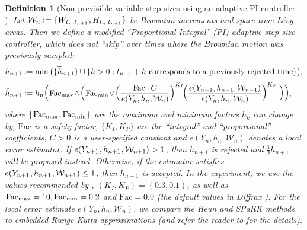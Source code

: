 \documentclass[sn-mathphys-num]{sn-jnl}%
\newtheorem{definition}{Definition}%
\newcommand{\m}{\hspace{0.25mm}}
\begin{document}
\begin{definition}[Non-previsible variable step sizes using an adaptive PI controller {\cite{ilie2015adaptive}}]
Let $\mathcal{W}_n := \{W_{t_n, t_{n+1}}\m, H_{t_n, t_{n+1}}\}$ be Brownian increments and space-time L\'{e}vy areas. Then we define a modified ``Proportional-Integral'' (PI) adaptive step size controller, which does not ``skip'' over times where the Brownian motion was previously sampled:\label{def:pi_controller}
\begin{align*}
h_{n+1} & := \min\big(\{\widetilde{h}_{n+1}\}\hspace{-0.125mm}\cup\hspace{-0.125mm}\{h > 0 : t_{n+1} + h\text{ corresponds to a previously rejected time}\}\big),\\[3pt]
\widetilde{h}_{n+1} & := h_n\bigg(\mathrm{Fac}_{\max}\hspace{-0.5mm}\wedge\hspace{-0.5mm}\bigg(\mathrm{Fac}_{\min}\hspace{-0.5mm}\vee\hspace{-0.5mm}\bigg(\frac{\mathrm{Fac}\cdot C}{e(Y_n, h_n, \mathcal{W}_n)}\bigg)^{K_I}\hspace{-0.5mm}\bigg(\frac{e(Y_{n-1}, h_{n-1}, \mathcal{W}_{n-1})}{e(Y_n, h_n, \mathcal{W}_n)}\bigg)^{K_P}\,\bigg)\bigg),
\end{align*}
where $\{\m\mathrm{Fac}_{\max}\m, \mathrm{Fac}_{\min}\}$ are the maximum and minimum factors $h_k$ can change by, $\mathrm{Fac}$ is a safety factor, $\{K_I, K_P\}$ are the ``integral'' and ``proportional'' coefficients, $C > 0$ is a  user-specified constant and $e(Y_n, h_n, \mathcal{W}_n)$ denotes a local error estimator. If $e(Y_{n+1}\m, h_{n+1}\m, \mathcal{W}_{n+1}) > 1$, then $h_{n+1}$ is rejected and $\frac{1}{2}h_{n+1}$ will be proposed instead. Otherwise, if the estimator satisfies $e(Y_{n+1}\m, h_{n+1}\m, \mathcal{W}_{n+1}) \leq 1$, then $h_{n+1}$ is accepted.\medbreak
In the experiment, we use the values recommended by \cite{ilie2015adaptive}, $(K_I, K_P) = (0.3, 0.1)$,
as well as $\m\mathrm{Fac}_{\max} = 10, \mathrm{Fac}_{\min} = 0.2$ and $\mathrm{Fac} = 0.9$ (the default values in Diffrax \cite{kidger2022nde}).
For the local error estimate $e(Y_n, h_n, \mathcal{W}_n)$, we compare the Heun and SPaRK methods to embedded Runge-Kutta approximations (and refer the reader to \cite{foster2024adaptive} for the details).
\end{definition}\medbreak
\end{document}
